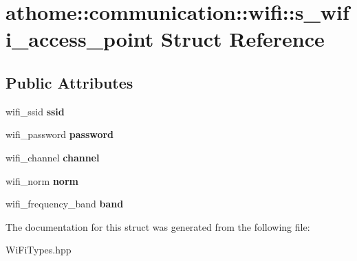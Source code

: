 \hypertarget{structathome_1_1communication_1_1wifi_1_1s__wifi__access__point}{}\section{athome\+:\+:communication\+:\+:wifi\+:\+:s\+\_\+wifi\+\_\+access\+\_\+point Struct Reference}
\label{structathome_1_1communication_1_1wifi_1_1s__wifi__access__point}
\subsection*{Public Attributes}
\begin{DoxyCompactItemize}
\item 
\mbox{\label{structathome_1_1communication_1_1wifi_1_1s__wifi__access__point_a215e9c0f8f72c926110bc7f46360e1ea}} 
wifi\+\_\+ssid {\bfseries ssid}
\item 
\mbox{\label{structathome_1_1communication_1_1wifi_1_1s__wifi__access__point_a13c710aba9ae52ad4360c667c914b988}} 
wifi\+\_\+password {\bfseries password}
\item 
\mbox{\label{structathome_1_1communication_1_1wifi_1_1s__wifi__access__point_accf0d6bf42e6d30be881bf9247200c73}} 
wifi\+\_\+channel {\bfseries channel}
\item 
\mbox{\label{structathome_1_1communication_1_1wifi_1_1s__wifi__access__point_acbae620a23b6d1a0dd073597f5e167bf}} 
wifi\+\_\+norm {\bfseries norm}
\item 
\mbox{\label{structathome_1_1communication_1_1wifi_1_1s__wifi__access__point_af738ada78d21e0c9d70b3d713bfd708c}} 
wifi\+\_\+frequency\+\_\+band {\bfseries band}
\end{DoxyCompactItemize}


The documentation for this struct was generated from the following file\+:\begin{DoxyCompactItemize}
\item 
Wi\+Fi\+Types.\+hpp\end{DoxyCompactItemize}
